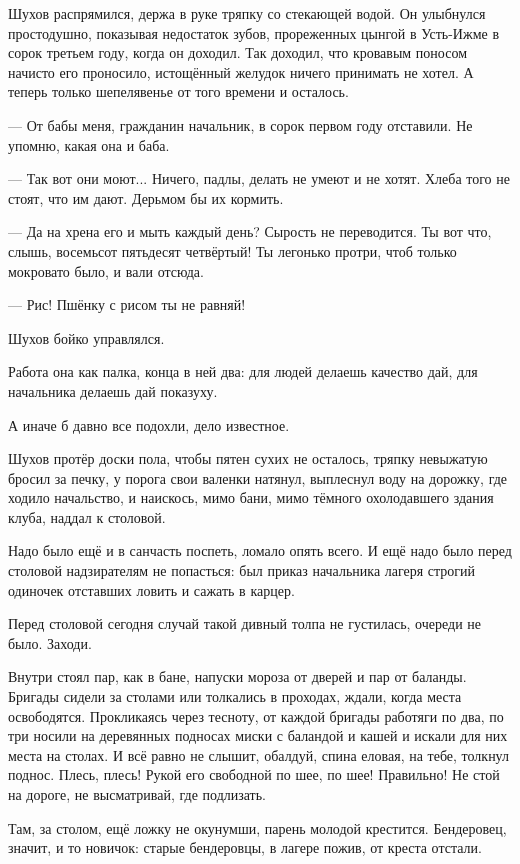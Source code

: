 Шухов распрямился, держа в руке тряпку со стекающей водой. Он улыбнулся простодушно,
показывая недостаток зубов, прореженных цынгой в Усть-Ижме в сорок третьем году, когда он
доходил. Так доходил, что кровавым поносом начисто его проносило, истощённый желудок ничего
принимать не хотел. А теперь только шепелявенье от того времени и осталось.

--- От бабы меня, гражданин начальник, в сорок первом году отставили. Не упомню, какая она и
баба.

--- Так вот они моют... Ничего, падлы, делать не умеют и не хотят. Хлеба того не стоят, что им
дают. Дерьмом бы их кормить.

--- Да на хрена его и мыть каждый день? Сырость не переводится. Ты вот что, слышь, восемьсот
пятьдесят четвёртый! Ты легонько протри, чтоб только мокровато было, и вали отсюда.

--- Рис! Пшёнку с рисом ты не равняй!

Шухов бойко управлялся.

Работа \dash она как палка, конца в ней два: для людей делаешь \dash качество дай, для начальника
делаешь \dash дай показуху.

А иначе б давно все подохли, дело известное.

Шухов протёр доски пола, чтобы пятен сухих не осталось, тряпку невыжатую бросил за печку, у
порога свои валенки натянул, выплеснул воду на дорожку, где ходило начальство, \dash и наискось,
мимо бани, мимо тёмного охолодавшего здания клуба, наддал к столовой.

Надо было ещё и в санчасть поспеть, ломало опять всего. И ещё надо было перед столовой
надзирателям не попасться: был приказ начальника лагеря строгий \dash одиночек отставших
ловить и сажать в карцер.

Перед столовой сегодня \dash случай такой дивный \dash толпа не густилась, очереди не было. Заходи.

Внутри стоял пар, как в бане, \dash напуски мороза от дверей и пар от баланды. Бригады сидели за
столами или толкались в проходах, ждали, когда места освободятся. Прокликаясь через тесноту,
от каждой бригады работяги по два, по три носили на деревянных подносах миски с баландой и
кашей и искали для них места на столах. И всё равно не слышит, обалдуй, спина еловая, на тебе,
толкнул поднос. Плесь, плесь! Рукой его свободной \dash по шее, по шее! Правильно! Не стой на
дороге, не высматривай, где подлизать.

Там, за столом, ещё ложку не окунумши, парень молодой крестится. Бендеровец, значит, и то
новичок: старые бендеровцы, в лагере пожив, от креста отстали.

